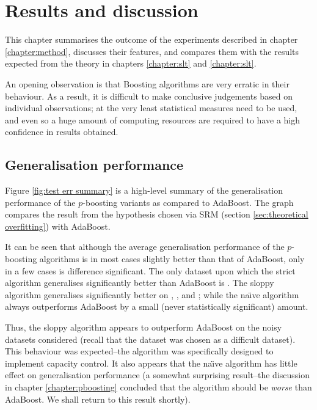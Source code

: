 
\chapter{Results and discussion}
\label{chapter:results}

This chapter summarises the outcome of the experiments described in
chapter \ref{chapter:method}, discusses their features, and compares
them with the results expected from the theory in chapters
\ref{chapter:slt} and \ref{chapter:slt}.

An opening observation is that Boosting algorithms are very erratic in
their behaviour.  As a result, it is difficult to make conclusive
judgements based on individual observations; at the very least
statistical measures need to be used, and even so a huge amount of
computing resources are required to have a high confidence in results
obtained.

\section{Generalisation performance}

Figure \ref{fig:test err summary} is a high-level summary of the
generalisation performance of the $p$-boosting variants as compared to
AdaBoost.  The graph compares the result from the hypothesis chosen
via SRM (section \ref{sec:theoretical overfitting}) with AdaBoost.

It can be seen that although the average generalisation performance of the
$p$-boosting algorithms is in most cases slightly better than that of
AdaBoost, only in a few cases is difference significant.  The only
dataset upon which the strict algorithm generalises significantly better
than AdaBoost is .  The sloppy algorithm generalises
significantly better on , ,  and
; while the na\"{\i}ve algorithm always outperforms
AdaBoost by a small (never statistically significant) amount.

Thus, the sloppy algorithm appears to outperform AdaBoost on the noisy
datasets considered (recall that the  dataset was chosen as
a difficult dataset).  This behaviour was expected--the algorithm was
specifically designed to implement capacity control.  It also appears
that the na\"{\i}ve algorithm has little effect on generalisation
performance (a somewhat surprising result--the discussion in chapter
\ref{chapter:pboosting} concluded that the algorithm should be
\emph{worse} than AdaBoost.  We shall return to this result shortly).


